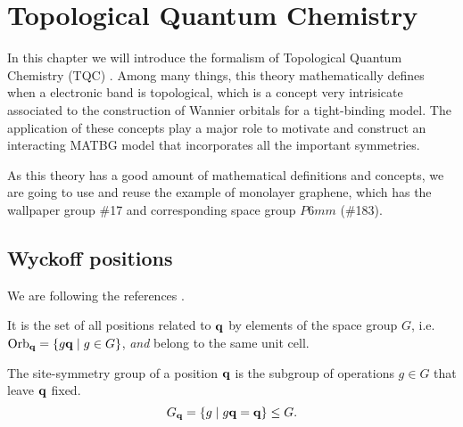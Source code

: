 



\chapter{Topological Quantum Chemistry}

In this chapter we will introduce the formalism of Topological Quantum Chemistry (TQC) \cite{topological_quantum_chemistry2017}. Among many things, this theory mathematically defines when a electronic band is topological, which is a concept very intrisicate associated to the construction of Wannier orbitals for a tight-binding model. The application of these concepts play a major role to motivate and construct an interacting MATBG model that incorporates all the important symmetries.

As this theory has a good amount of mathematical definitions and concepts, we are going to use and reuse the example of monolayer graphene, which has the wallpaper group \#17 and corresponding space group $P6mm$ (\#183).

\section{Wyckoff positions}

We are following the references \cite{lectures_tms2017, building_blocks2018}.

\begin{definition}[Orbit of $\q$] \label{def:orbit_q}
It is the set of all positions related to $\q$ by elements of the space group $G$, i.e. $\text{Orb}_{\vb{q}} = \{g {\vb{q}} \mid g \in G\}$, \textit{and} belong to the same unit cell.
\end{definition}

\begin{definition} \label{def:sitesym}
The site-symmetry group of a position $\q$ is the subgroup of operations $g \in G$ that leave $\q$ fixed.
$$
G_{\vb{q}} = \{g \mid g {\vb{q}} = {\vb{q}}\} \leq G.
$$
\end{definition}

